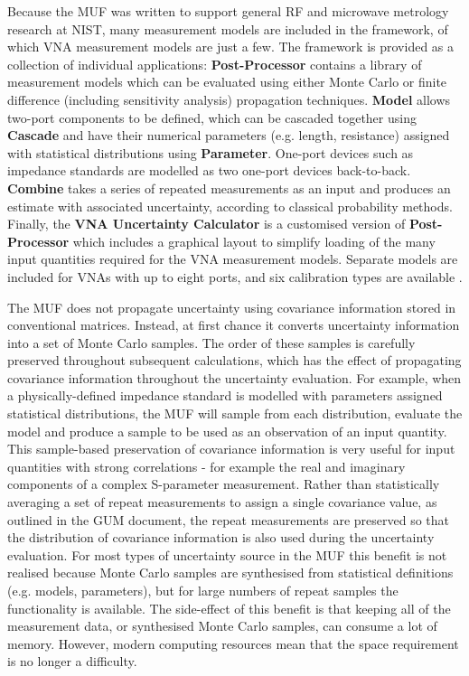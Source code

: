 \documentclass[../thesis/thesis.tex]{subfiles}
\begin{document}
Because the MUF was written to support general RF and microwave metrology research at NIST, many measurement models are included in the framework, of which VNA measurement models are just a few. The framework is provided as a collection of individual applications: \textbf{Post-Processor} contains a library of measurement models which can be evaluated using either Monte Carlo or finite difference (including sensitivity analysis) propagation techniques. \textbf{Model} allows two-port components to be defined, which can be cascaded together using \textbf{Cascade} and have their numerical parameters (e.g. length, resistance) assigned with statistical distributions using \textbf{Parameter}. One-port devices such as impedance standards are modelled as two one-port devices back-to-back. \textbf{Combine} takes a series of repeated measurements as an input and produces an estimate with associated uncertainty, according to classical probability methods. Finally, the \textbf{VNA Uncertainty Calculator} is a customised version of \textbf{Post-Processor} which includes a graphical layout to simplify loading of the many input quantities required for the VNA measurement models. Separate models are included for VNAs with up to eight ports, and six calibration types are available \cite{Jargon_2019}.

The MUF does not propagate uncertainty using covariance information stored in conventional matrices. Instead, at first chance it converts uncertainty information into a set of Monte Carlo samples. The order of these samples is carefully preserved throughout subsequent calculations, which has the effect of propagating covariance information throughout the uncertainty evaluation. For example, when a physically-defined impedance standard is modelled with parameters assigned statistical distributions, the MUF will sample from each distribution, evaluate the model and produce a sample to be used as an observation of an input quantity. This sample-based preservation of covariance information is very useful for input quantities with strong correlations - for example the real and imaginary components of a complex S-parameter measurement. Rather than statistically averaging a set of repeat measurements to assign a single covariance value, as outlined in the GUM document, the repeat measurements are preserved so that the distribution of covariance information is also used during the uncertainty evaluation. For most types of uncertainty source in the MUF this benefit is not realised because Monte Carlo samples are synthesised from statistical definitions (e.g. models, parameters), but for large numbers of repeat samples the functionality is available. The side-effect of this benefit is that keeping all of the measurement data, or synthesised Monte Carlo samples, can consume a lot of memory. However, modern computing resources mean that the space requirement is no longer a difficulty.
\end{document}
